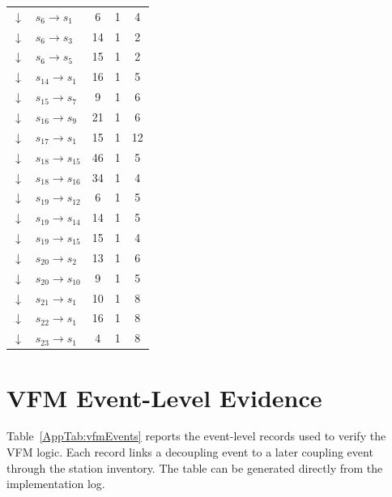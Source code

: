 \documentclass[11pt]{article}
\begin{document}
\begin{table}[!htbp]
\begin{tabular}{clccc}
		$\downarrow$ & $s_6 \to s_1$ & 6 & 1 & 4 \\
		$\downarrow$ & $s_6 \to s_3$ & 14 & 1 & 2 \\
		$\downarrow$ & $s_6 \to s_5$ & 15 & 1 & 2 \\
		$\downarrow$ & $s_{14} \to s_1$ & 16 & 1 & 5 \\
		$\downarrow$ & $s_{15} \to s_7$ & 9 & 1 & 6 \\
		$\downarrow$ & $s_{16} \to s_9$ & 21 & 1 & 6 \\
		$\downarrow$ & $s_{17} \to s_1$ & 15 & 1 & 12 \\
		$\downarrow$ & $s_{18} \to s_{15}$ & 46 & 1 & 5 \\
		$\downarrow$ & $s_{18} \to s_{16}$ & 34 & 1 & 4 \\
		$\downarrow$ & $s_{19} \to s_{12}$ & 6 & 1 & 5 \\
		$\downarrow$ & $s_{19} \to s_{14}$ & 14 & 1 & 5 \\
		$\downarrow$ & $s_{19} \to s_{15}$ & 15 & 1 & 4 \\
		$\downarrow$ & $s_{20} \to s_2$ & 13 & 1 & 6 \\
		$\downarrow$ & $s_{20} \to s_{10}$ & 9 & 1 & 5 \\
		$\downarrow$ & $s_{21} \to s_1$ & 10 & 1 & 8 \\
		$\downarrow$ & $s_{22} \to s_1$ & 16 & 1 & 8 \\
		$\downarrow$ & $s_{23} \to s_1$ & 4 & 1 & 8 \\
		\bottomrule
	\end{tabular}
\end{table}

\FloatBarrier

\section{VFM Event-Level Evidence}
\label{App:VFMEvents}

Table~\ref{AppTab:vfmEvents} reports the event-level records used to verify the VFM logic. Each record links a decoupling event to a later coupling event through the station inventory. The table can be generated directly from the implementation log.
\end{document}
